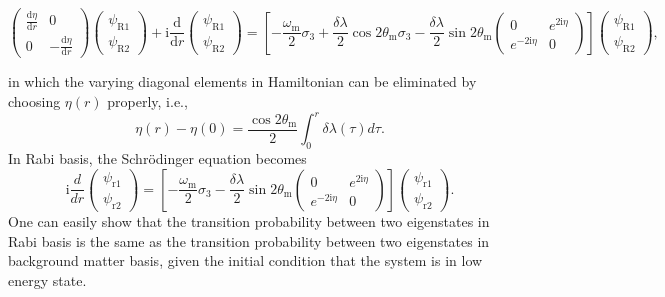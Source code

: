 \documentclass[%
reprint,
 amsmath,amssymb,
 prd,
]{revtex4-1}
\newcommand{\ri}{\mathrm{i}}
\begin{document}
\begin{widetext}
\begin{equation*}
    \begin{pmatrix}  \frac{\mathrm d\eta}{\mathrm dr}  & 0 \\ 0 & - \frac{\mathrm d\eta}{\mathrm d r}  \end{pmatrix} \begin{pmatrix} \psi_{\mathrm R1} \\ \psi_{\mathrm R2} \end{pmatrix} + \mathrm i \frac{\mathrm d}{\mathrm dr} \begin{pmatrix} \psi_{\mathrm R1} \\ \psi_{\mathrm R2} \end{pmatrix} 
    = \left[ -\frac{\omega_{\mathrm m} }{2} \sigma_3  + \frac{\delta \lambda}{2} \cos 2\theta_{\mathrm m}  \sigma_3  - \frac{\delta \lambda}{2} \sin 2\theta_{\mathrm m} \begin{pmatrix} 0 & e^{2\mathrm i\eta} \\ e^{-2 \mathrm i\eta } & 0 \end{pmatrix}   \right] \begin{pmatrix} \psi_{\mathrm R1} \\ \psi_{\mathrm R2} \end{pmatrix},
\end{equation*}
\end{widetext}
in which the varying diagonal elements in Hamiltonian can be eliminated by choosing $\eta(r)$ properly, i.e.,
\begin{equation}
    \eta(r) - \eta(0) =  \frac{\cos 2\theta_{\mathrm{m}}}{2} \int_0^r \delta\lambda (\tau) d\tau.
\end{equation}
In Rabi basis, the Schr\"{o}dinger equation becomes
\begin{equation*}
    \ri \frac{d}{dr} \begin{pmatrix} \psi_{\mathrm r1} \\ \psi_{\mathrm r2} \end{pmatrix} = \left[ - \frac{\omega_{\mathrm m}}{2} \sigma_3 - \frac{\delta \lambda}{2} \sin 2\theta_{\mathrm m} \begin{pmatrix} 0 & e^{2\ri\eta} \\ e^{-2 \ri \eta } & 0 \end{pmatrix}\right] \begin{pmatrix} \psi_{\mathrm r1} \\ \psi_{\mathrm r2} \end{pmatrix}.
\end{equation*}
One can easily show that the transition probability between two eigenstates in Rabi basis is the same as the transition probability between two eigenstates in background matter basis, given the initial condition that the system is in low energy state.
\end{document}
